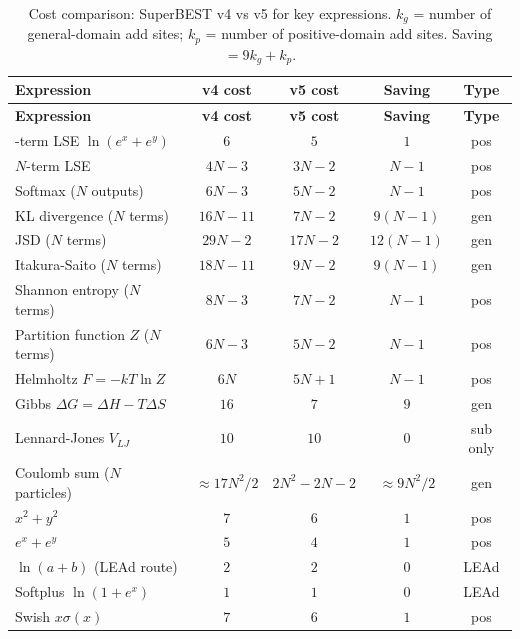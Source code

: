 \documentclass[12pt,a4paper]{article}
\theoremstyle{definition}
\begin{document}
\begin{longtable}{@{}lcccc@{}}
\caption{Cost comparison: SuperBEST v4 vs v5 for key expressions.
  $k_g$ = number of general-domain add sites;
  $k_p$ = number of positive-domain add sites.
  Saving $= 9k_g + k_p$.}
\label{tab:summary}
\\
\toprule
\textbf{Expression} & \textbf{v4 cost} & \textbf{v5 cost} & \textbf{Saving} & \textbf{Type} \\
\midrule
\endfirsthead
\midrule
\textbf{Expression} & \textbf{v4 cost} & \textbf{v5 cost} & \textbf{Saving} & \textbf{Type} \\
\midrule
\endhead
\bottomrule
\endfoot
2-term LSE $\ln(e^x + e^y)$     & $6$       & $5$       & $1$       & pos \\
$N$-term LSE                    & $4N{-}3$  & $3N{-}2$  & $N{-}1$   & pos \\
Softmax ($N$ outputs)           & $6N{-}3$  & $5N{-}2$  & $N{-}1$   & pos \\
KL divergence ($N$ terms)       & $16N{-}11$& $7N{-}2$  & $9(N{-}1)$& gen \\
JSD ($N$ terms)                 & $29N{-}2$ & $17N{-}2$ & $12(N{-}1)$& gen \\
Itakura-Saito ($N$ terms)       & $18N{-}11$& $9N{-}2$  & $9(N{-}1)$& gen \\
Shannon entropy ($N$ terms)     & $8N{-}3$  & $7N{-}2$  & $N{-}1$   & pos \\
Partition function $Z$ ($N$ terms) & $6N{-}3$ & $5N{-}2$ & $N{-}1$  & pos \\
Helmholtz $F = -kT\ln Z$        & $6N$      & $5N{+}1$  & $N{-}1$   & pos \\
Gibbs $\Delta G = \Delta H - T\Delta S$ & $16$ & $7$  & $9$       & gen \\
Lennard-Jones $V_{LJ}$          & $10$      & $10$      & $0$       & sub only \\
Coulomb sum ($N$ particles)     & ${\approx}17N^2/2$ & $2N^2{-}2N{-}2$ & ${\approx}9N^2/2$ & gen \\
$x^2 + y^2$                     & $7$       & $6$       & $1$       & pos \\
$e^x + e^y$                     & $5$       & $4$       & $1$       & pos \\
$\ln(a+b)$ (LEAd route)         & $2$       & $2$       & $0$       & LEAd \\
Softplus $\ln(1+e^x)$           & $1$       & $1$       & $0$       & LEAd \\
Swish $x\sigma(x)$              & $7$       & $6$       & $1$       & pos \\

\end{longtable}
\end{document}
